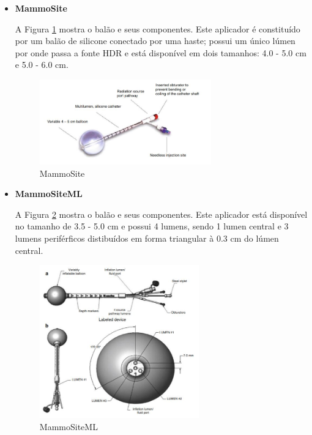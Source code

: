 \documentclass[11pt,a4paper]{article}
\begin{document}
			\begin{itemize}
				\item \textbf{\textcolor{CarnationPink}{MammoSite}}
				
					A Figura \ref{img:mammosite} mostra o balão e seus componentes. Este aplicador é constituído por um balão de silicone conectado por uma haste; possui um único lúmen por onde passa a fonte HDR e está disponível em dois tamanhos: 4.0 - 5.0 cm e 5.0 - 6.0 cm.

					\begin{figure}[h]
						\centering
						\includegraphics[width=0.7\textwidth]{Imagens/balaoMammoSite.JPG}
						\caption{MammoSite}
						\label{img:mammosite}
					\end{figure}

				\item \textbf{\textcolor{CarnationPink}{MammoSiteML}}
				
					A Figura \ref{img:mammositeml} mostra o balão e seus componentes. Este aplicador está disponível no tamanho de 3.5 - 5.0 cm e possui 4 lumens, sendo 1 lumen central e 3 lumens periférficos distibuídos em forma triangular à 0.3 cm do lúmen central.

					\begin{figure}[h]
						\centering
						\includegraphics[width=0.65\textwidth]{Imagens/mammositeML.JPG}
						\caption{MammoSiteML}
						\label{img:mammositeml}
					\end{figure}


\end{itemize}
\end{document}
